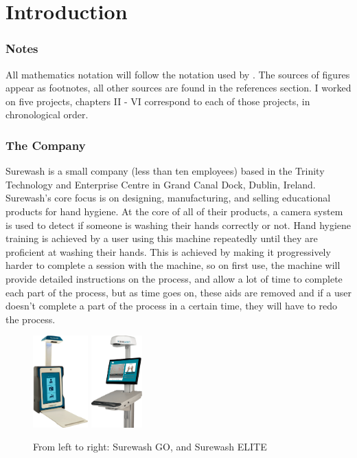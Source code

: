 \part{Introduction}
\section{Notes}
All mathematics notation will follow the notation used by \cite{Goodfellow-et-al-2016}. The sources of figures appear as footnotes, all other sources are found in the references section. I worked on five projects, chapters II - VI correspond to each of those projects, in chronological order.

\section{The Company}
Surewash is a small company (less than ten employees) based in the Trinity Technology and Enterprise Centre in Grand Canal Dock, Dublin, Ireland. Surewash's core focus is on designing, manufacturing, and selling educational products for hand hygiene. At the core of all of their products, a camera system is used to detect if someone is washing their hands correctly or not. Hand hygiene training is achieved by a user using this machine repeatedly until they are proficient at washing their hands. This is achieved by making it progressively harder to complete a session with the machine, so on first use, the machine will provide detailed instructions on the process, and allow a lot of time to complete each part of the process, but as time goes on, these aids are removed and if a user doesn't complete a part of the process in a certain time, they will have to redo the process.

\begin{figure}[h]
    \centering
    \includegraphics[height=100pt]{../img/sw_go.png}
    \space \space \space \space \space \space \space \space \space \space \space \space
    \includegraphics[height=100pt]{../img/sw_elite.png}
    \caption[]{From left to right: Surewash GO, and Surewash ELITE\footnotemark}
    \label{fig:sw_elite_go}
\end{figure}

